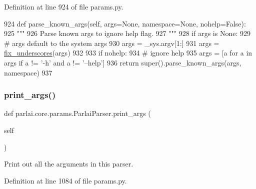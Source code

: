 Definition at line 924 of file params.\+py.


\begin{DoxyCode}
924     \textcolor{keyword}{def }parse\_known\_args(self, args=None, namespace=None, nohelp=False):
925         \textcolor{stringliteral}{"""}
926 \textcolor{stringliteral}{        Parse known args to ignore help flag.}
927 \textcolor{stringliteral}{        """}
928         \textcolor{keywordflow}{if} args \textcolor{keywordflow}{is} \textcolor{keywordtype}{None}:
929             \textcolor{comment}{# args default to the system args}
930             args = \_sys.argv[1:]
931         args = \hyperlink{namespaceparlai_1_1core_1_1params_afe2837a1dc21017be30cc7e3cb3696b8}{fix\_underscores}(args)
932 
933         \textcolor{keywordflow}{if} nohelp:
934             \textcolor{comment}{# ignore help}
935             args = [a \textcolor{keywordflow}{for} a \textcolor{keywordflow}{in} args \textcolor{keywordflow}{if} a != \textcolor{stringliteral}{'-h'} \textcolor{keywordflow}{and} a != \textcolor{stringliteral}{'--help'}]
936         \textcolor{keywordflow}{return} super().parse\_known\_args(args, namespace)
937 
\end{DoxyCode}
\mbox{\label{classparlai_1_1core_1_1params_1_1ParlaiParser_adb1dec3d3433b40209bb2c24722df335}} 
\subsubsection{\texorpdfstring{print\+\_\+args()}{print\_args()}}
{\footnotesize\ttfamily def parlai.\+core.\+params.\+Parlai\+Parser.\+print\+\_\+args (\begin{DoxyParamCaption}\item[{}]{self }\end{DoxyParamCaption})}

\begin{DoxyVerb}Print out all the arguments in this parser.
\end{DoxyVerb}
 

Definition at line 1084 of file params.\+py.


